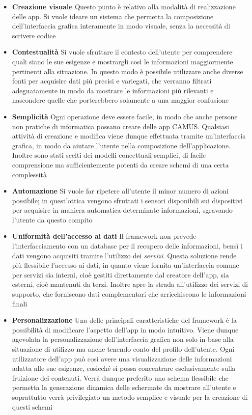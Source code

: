 \begin{itemize}
	\item \textbf{Creazione visuale} Questo punto è relativo alla modalità di realizzazione delle app. Si vuole ideare un sistema che permetta la composizione dell'interfaccia grafica interamente in modo visuale, senza la necessità di scrivere codice
	\item \textbf{Contestualità} Si vuole sfruttare il contesto dell'utente per comprendere quali siano le sue esigenze e mostrargli così le informazioni maggiormente pertinenti alla situazione. In questo modo è possibile utilizzare anche diverse fonti per acquisire dati più precisi e variegati, che verranno filtrati adeguatamente in modo da mostrare le informazioni più rilevanti e nascondere quelle che porterebbero solamente a una maggior confusione
	\item \textbf{Semplicità} Ogni operazione deve essere facile, in modo che anche persone non pratiche di informatica possano creare delle app CAMUS. Qualsiasi attività di creazione e modifica viene dunque effettuata tramite un'interfaccia grafica, in modo da aiutare l'utente nella composizione dell'applicazione. Inoltre sono stati scelti dei modelli concettuali semplici, di facile comprensione ma sufficientemente potenti da creare schemi di una certa complessità
	\item \textbf{Automazione} Si vuole far ripetere all'utente il minor numero di azioni possibile; in quest'ottica vengono sfruttati i sensori disponibili sui dispositivi per acquisire in maniera automatica determinate informazioni, sgravando l'utente da questo compito
	\item \textbf{Uniformità dell'accesso ai dati} Il framework non prevede l'interfacciamento con un database per il recupero delle informazioni, bensì i dati vengono acquisiti tramite l'utilizzo dei \emph{servizi}. Questa soluzione rende più flessibile l'accesso ai dati, in quanto viene fornita un'interfaccia comune per servizi sia interni, cioè gestiti direttamente dal creatore dell'app, sia esterni, cioè mantenuti da terzi. Inoltre apre la strada all'utilizzo dei servizi di supporto, che forniscono dati complementari che arricchiscono le informazioni finali
	\item \textbf{Personalizzazione} Una delle principali caratteristiche del framework è la possibilità di modificare l'aspetto dell'app in modo intuitivo. Viene dunque agevolata la personalizzazione dell'interfaccia grafica non solo in base alla situazione di utilizzo ma anche tenendo conto del profilo dell'utente. Ogni utilizzatore dell'app può così avere una visualizzazione delle informazioni adatta alle sue esigenze, cosicché si possa concentrare esclusivamente sulla fruizione dei contenuti. Verrà dunque preferito uno schema flessibile che permetta la generazione dinamica delle schermate da mostrare all'utente e soprattutto verrà privilegiato un metodo semplice e visuale per la creazione di questi schemi

\end{itemize}
